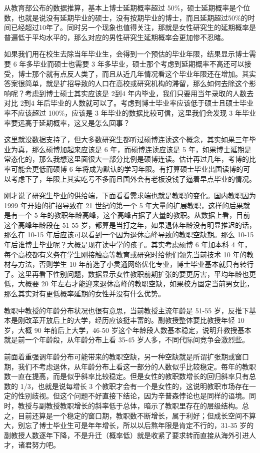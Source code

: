\documentclass[]{tufte-book}
\begin{document}
从教育部公布的数据推算，基本上博士延期概率超过 50\%，硕士延期概率是个位数，也就是说没有延期毕业的硕士，没有按期毕业的博士，而且延期超过50\%的时间已经超过10年了。同时另一个现象也值得关注，那就是女性研究生的延期概率是普遍低于平均水平的，那么对应的男性研究生延期概率会更加惨不忍睹。

如果我们用在校生去除当年毕业生，会得到一个预估的毕业年限，结果显示博士需要 6 年多毕业而硕士也需要 3 年多毕业，硕士那个考虑到延期概率不高还可以接受，博士那个就有点反人类了，而且从近几年情况看这个毕业年限还在增加。其实答案很简单，就是扩招导致的人口在高校或研究机构的滞留，那么如何去除这个影响呢？考虑到博士硕士其实应该是 2到4 年内毕业，我们只要用当年录取的人数去对比 2到4 年后毕业的人数就可以了。考虑到博士毕业率应该低于硕士且硕士毕业率不应该超过 100\%，应该是 3 年毕业的数据比较可信，这里我们会发现 3 年毕业率要远高于延期概率，这又是怎么回事？

这里就没数据支持了，但大多数研究生都听过硕博连读这个概念，其实如果三年毕业为真，那么硕博加起来应该是 6 年，而硕博连读应该是 5 年，如果博士延期是常态化的，那么我想这里面很大一部分比例是硕博连读。估计再过几年，考博的比率可能会更低而硕博 6 年将成为默认的学习年限。有打算硕士毕业出国读博的可以考虑下了，年限上其实吃亏不多而且国外会有老板没钱了逼着早点毕业的情况。

刚才说了研究生毕业的供给端，下面看看需求端也就是教职的变化。国内教职因为 1999 年开始的扩招导致在 21 世纪的第一个 5 年大量的扩展教职，这样的后果就是有一个 5 年的教职年龄高峰，这个高峰占据了大量的教职。从数据上看，目前这个高峰年龄段在 51-55 岁，都算是当打之年，如果退休年龄没有明显推迟的话，那么在 10-15 年后应该可以看到一个因为退休高峰导致的教职空缺期。那么 10-15 年后谁博士毕业呢？大概是现在读中学的孩子。其实考虑硕博 6 年加本科 4 年，每个高校都有义务在学生刚接触高等教育或研究时给他们领先当前技术 10 年的教材与方法，否则学生 10 年前选了小灵通网络优化专业，博士毕业基本就只有转行了。这里再看下性别问题，数据显示女性教职前期扩张的要更厉害，平均年龄也更低，大概要 20 年左右才能迎来退休高峰的教职空缺，如果校方固定当前男女比，那么其实对有更低概率延期的女性并没有什么优势。

教职中教授的年龄分布状况也很有意思，当前教授主流年龄是 51-55 岁，反推下基本是刚改革开放后上的大学，经历应该挺丰富的。副教授整体要比教授年轻 10 岁，大概 90 年前后上大学，46-50 岁这个年龄段人数基本稳定，说明升教授基本就是前一个年龄段，从年龄分布上看 35-45 岁人多，不同代际间竞争会激烈些。

前面着重强调年龄分布可能带来的教职空缺，另一种空缺就是所谓扩张期或窗口期，我们不考虑退休，从年龄分布上看这一部分的人数似乎比较稳定。每年的教职数一直在提高，而是似乎斜率比较稳定。但是女性的教职数增长的回归斜率只有总数的 1/3，也就是说每增长 3 个教职才会有一个是女性的，这说明教职市场存在一定的性别歧视。但这个问题不好直接下结论，因为辛普森悖论也是同样的语境。同时，教授与副教授教职增长的斜率低于总体，暗示了教职里存在的层级结构。总之，目前还算是一个稳定的窗口期，教职数不断增长，属于利好；但成长空间不算大，别忘了博士毕业生可是年年增长，所以以后熬年限是肯定不行的，31-35 岁的副教授人数逐年下降，不是升迁（概率低）就是收紧了要求转而直接从海外引进人才，诸君努力吧。
\end{document}
